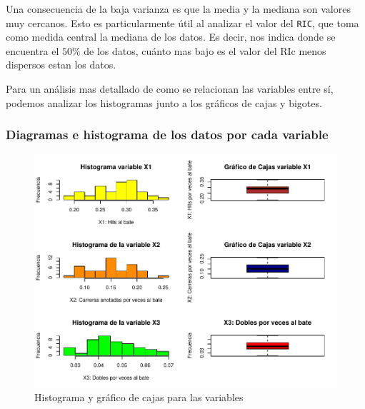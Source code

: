 \documentclass{staprojteamusb}
\begin{document}
 Una consecuencia de la baja varianza es que la media y la mediana son valores muy cercanos. Esto es particularmente útil al analizar el valor del \texttt{RIC}, que toma como medida central la mediana de los datos. Es decir, nos indica donde se encuentra el \(50\%\) de los datos, cuánto mas bajo es el valor del RIc menos dispersos estan los datos.

 Para un análisis mas detallado de como se relacionan las variables entre sí, podemos analizar los histogramas junto a los gráficos de cajas y bigotes.

 \vspace{10mm}

 \hypertarget{diagramas-e-histograma-de-los-datos-por-cada-variable}{%
 \subsubsection{Diagramas e histograma de los datos por cada variable}\label{diagramas-e-histograma-de-los-datos-por-cada-variable}}

 \begin{figure}
 \centering
 \includegraphics{C03322-InformeFinal-Cordero-Gavazut-Riera_files/figure-latex/boxplots-1.pdf}
 \caption{\label{fig:boxplots}Histograma y gráfico de cajas para las variables}
 \end{figure}
\end{document}
